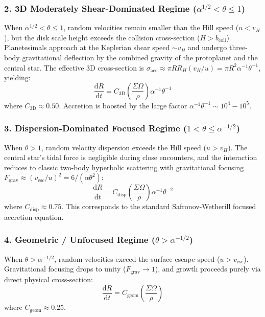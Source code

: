 \documentclass[11pt,a4paper]{article}
\begin{document}
\subsubsection{\texorpdfstring{2. 3D Moderately Shear-Dominated Regime ($\alpha^{1/2} < \theta \le 1$)}{2. 3D Moderately Shear-Dominated Regime}}
When $\alpha^{1/2} < \theta \le 1$, random velocities remain smaller than the Hill speed ($u < v_H$), but the disk scale height exceeds the collision cross-section ($H > b_{\text{coll}}$). Planetesimals approach at the Keplerian shear speed $\sim v_H$ and undergo three-body gravitational deflection by the combined gravity of the protoplanet and the central star. The effective 3D cross-section is $\sigma_{\text{acc}} \approx \pi R R_H (v_H / u) = \pi R^2 \alpha^{-1} \theta^{-1}$, yielding:
\begin{equation}
\frac{\mathrm{d}R}{\mathrm{d}t} = C_{\text{3D}} \left(\frac{\Sigma \Omega}{\rho}\right) \alpha^{-1} \theta^{-1}
\label{eq:regime_3d}
\end{equation}
where $C_{\text{3D}} \approx 0.50$. Accretion is boosted by the large factor $\alpha^{-1} \theta^{-1} \sim 10^4-10^5$.

\subsubsection{\texorpdfstring{3. Dispersion-Dominated Focused Regime ($1 < \theta \le \alpha^{-1/2}$)}{3. Dispersion-Dominated Focused Regime}}
When $\theta > 1$, random velocity dispersion exceeds the Hill speed ($u > v_H$). The central star's tidal force is negligible during close encounters, and the interaction reduces to classic two-body hyperbolic scattering with gravitational focusing $F_{\text{grav}} \approx (v_{\text{esc}} / u)^2 = 6 / (\alpha \theta^2)$:
\begin{equation}
\frac{\mathrm{d}R}{\mathrm{d}t} = C_{\text{disp}} \left(\frac{\Sigma \Omega}{\rho}\right) \alpha^{-1} \theta^{-2}
\label{eq:regime_disp}
\end{equation}
where $C_{\text{disp}} \approx 0.75$. This corresponds to the standard Safronov-Wetherill focused accretion equation.

\subsubsection{\texorpdfstring{4. Geometric / Unfocused Regime ($\theta > \alpha^{-1/2}$)}{4. Geometric / Unfocused Regime}}
When $\theta > \alpha^{-1/2}$, random velocities exceed the surface escape speed ($u > v_{\text{esc}}$). Gravitational focusing drops to unity ($F_{\text{grav}} \to 1$), and growth proceeds purely via direct physical cross-section:
\begin{equation}
\frac{\mathrm{d}R}{\mathrm{d}t} = C_{\text{geom}} \left(\frac{\Sigma \Omega}{\rho}\right)
\label{eq:regime_geom}
\end{equation}
where $C_{\text{geom}} \approx 0.25$.
\end{document}
